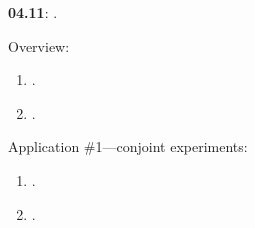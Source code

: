 \documentclass[letterpaper]{article}
\renewenvironment{itemize}{
  \begin{list}{}{
    \setlength{\leftmargin}{1.5em}
  }
}{
  \end{list}
}
\begin{document}
\begin{enumerate}
\begin{itemize}
      \end{itemize}



	\item {\bf 04.11}: {\color{ForestGreen}{\bf Survey Experiments: Conjoint and List Designs}}.

			\begin{itemize} 

        \item[$\diamond$] Overview:

        \begin{enumerate}

          \item[$\bullet$] \href{https://www.cambridge.org/core/product/identifier/S1047198700006343/type/journal_article}{}.

          \item[$\bullet$] \href{https://www.cambridge.org/core/product/identifier/S2052263015000196/type/journal_article}{}.

        \end{enumerate}

       \item[$\diamond$] Application \#1---conjoint experiments:

           \begin{enumerate}


           \item[$\bullet$] \href{https://www.cambridge.org/core/product/identifier/S1047198700013589/type/journal_article}{}.


           \item[$\bullet$] \href{https://doi.org/10.1017/pan.2019.30}{}.

        

         \end{enumerate}


\end{itemize}
\end{enumerate}
\end{document}
